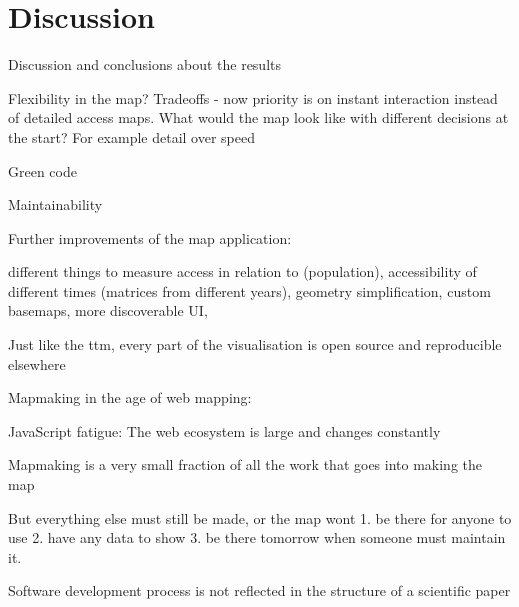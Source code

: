 \section{Discussion}

Discussion and conclusions about the results

Flexibility in the map? Tradeoffs - now priority is on instant interaction instead of detailed access maps.
What would the map look like with different decisions at the start? For example detail over speed

Green code

Maintainability

Further improvements of the map application:

different things to measure access in relation to (population),
accessibility of different times (matrices from different years),
geometry simplification,
custom basemaps,
more discoverable UI,

Just like the \acrshort{ttm}, every part of the visualisation is open source and reproducible elsewhere

Mapmaking in the age of web mapping:

JavaScript fatigue: The web ecosystem is large and changes constantly

Mapmaking is a very small fraction of all the work that goes into making the map

But everything else must still be made, or the map wont 1. be there for anyone to use 2. have any data to show 3. be there tomorrow when someone must maintain it.

Software development process is not reflected in the structure of a scientific paper
